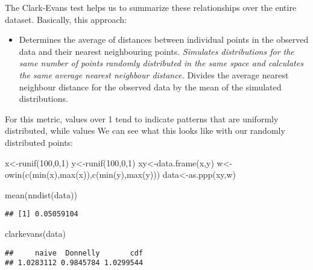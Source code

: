 \documentclass[
]{book}
\newenvironment{Shaded}{\begin{snugshade}}{\end{snugshade}}
\newcommand{\DecValTok}[1]{\textcolor[rgb]{0.00,0.00,0.81}{#1}}
\newcommand{\FunctionTok}[1]{\textcolor[rgb]{0.00,0.00,0.00}{#1}}
\newcommand{\NormalTok}[1]{#1}
\newcommand{\OtherTok}[1]{\textcolor[rgb]{0.56,0.35,0.01}{#1}}
\providecommand{\tightlist}{%
  \setlength{\itemsep}{0pt}\setlength{\parskip}{0pt}}
\begin{document}
The Clark-Evans test helps us to summarize these relationships over the entire dataset. Basically, this approach:

\begin{itemize}
\tightlist
\item
  Determines the average of distances between individual points in the observed data and their nearest neighbouring points.
  \emph{Simulates distributions for the same number of points randomly distributed in the same space and calculates the same average nearest neighbour distance.
  }Divides the average nearest neighbour distance for the observed data by the mean of the simulated distributions.
\end{itemize}

For this metric, values over 1 tend to indicate patterns that are uniformly distributed, while values We can see what this looks like with our randomly distributed points:

\begin{Shaded}
\begin{Highlighting}[]
\NormalTok{x}\OtherTok{\textless{}{-}}\FunctionTok{runif}\NormalTok{(}\DecValTok{100}\NormalTok{,}\DecValTok{0}\NormalTok{,}\DecValTok{1}\NormalTok{)}
\NormalTok{y}\OtherTok{\textless{}{-}}\FunctionTok{runif}\NormalTok{(}\DecValTok{100}\NormalTok{,}\DecValTok{0}\NormalTok{,}\DecValTok{1}\NormalTok{)}
\NormalTok{xy}\OtherTok{\textless{}{-}}\FunctionTok{data.frame}\NormalTok{(x,y)}
\NormalTok{w}\OtherTok{\textless{}{-}}\FunctionTok{owin}\NormalTok{(}\FunctionTok{c}\NormalTok{(}\FunctionTok{min}\NormalTok{(x),}\FunctionTok{max}\NormalTok{(x)),}\FunctionTok{c}\NormalTok{(}\FunctionTok{min}\NormalTok{(y),}\FunctionTok{max}\NormalTok{(y)))}
\NormalTok{data}\OtherTok{\textless{}{-}}\FunctionTok{as.ppp}\NormalTok{(xy,w)}

\FunctionTok{mean}\NormalTok{(}\FunctionTok{nndist}\NormalTok{(data))}
\end{Highlighting}
\end{Shaded}

\begin{verbatim}
## [1] 0.05059104
\end{verbatim}

\begin{Shaded}
\begin{Highlighting}[]
\FunctionTok{clarkevans}\NormalTok{(data)}
\end{Highlighting}
\end{Shaded}

\begin{verbatim}
##     naive  Donnelly       cdf 
## 1.0283112 0.9845784 1.0299544
\end{verbatim}
\end{document}
